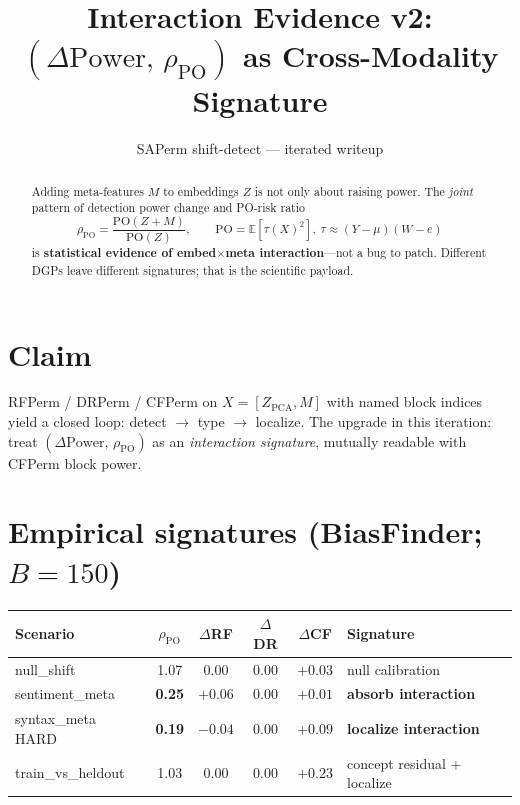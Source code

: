 \documentclass[11pt]{article}
\title{Interaction Evidence v2:\\
$(\Delta\mathrm{Power},\,\rho_{\mathrm{PO}})$ as Cross-Modality Signature}
\author{SAPerm shift-detect --- iterated writeup}
\date{}
\begin{document}
\maketitle

\begin{abstract}
\noindent
Adding meta-features $M$ to embeddings $Z$ is not only about raising power.
The \emph{joint} pattern of detection power change and PO-risk ratio
\[
\rho_{\mathrm{PO}}
=\frac{\mathrm{PO}(Z{+}M)}{\mathrm{PO}(Z)},
\qquad
\mathrm{PO}=\mathbb{E}[\tau(X)^2],\ 
\tau\approx(Y-\mu)(W-e)
\]
is \textbf{statistical evidence of embed$\times$meta interaction}---not a bug
to patch. Different DGPs leave different signatures; that is the scientific
payload.
\end{abstract}

\section{Claim}
RFPerm / DRPerm / CFPerm on $X=[Z_{\mathrm{PCA}},M]$ with named block indices
yield a closed loop: detect $\to$ type $\to$ localize.
The upgrade in this iteration: treat
$(\Delta\mathrm{Power},\,\rho_{\mathrm{PO}})$ as an \emph{interaction
signature}, mutually readable with CFPerm block power.

\section{Empirical signatures (BiasFinder; $B{=}150$)}
\begin{center}
\begin{tabular}{lcccc}
\toprule
Scenario & $\rho_{\mathrm{PO}}$ & $\Delta$RF & $\Delta$DR & $\Delta$CF & Signature \\
\midrule
null\_shift & 1.07 & 0.00 & 0.00 & $+0.03$ & null calibration \\
sentiment\_meta & \textbf{0.25} & $+0.06$ & 0.00 & $+0.01$ & \textbf{absorb interaction} \\
syntax\_meta HARD & \textbf{0.19} & $-0.04$ & 0.00 & $\mathbf{+0.09}$ & \textbf{localize interaction} \\
train\_vs\_heldout & 1.03 & 0.00 & 0.00 & $\mathbf{+0.23}$ & concept residual + localize \\
\bottomrule
\end{tabular}
\end{center}
\end{document}
